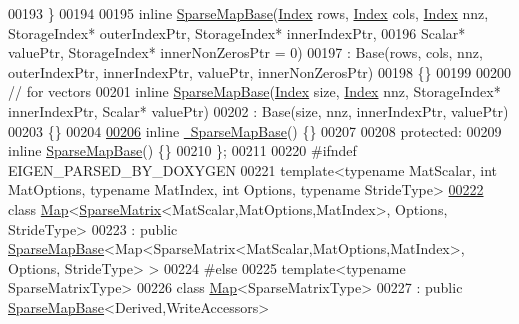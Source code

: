 \begin{DoxyCode}
00193     \}
00194     
00195     \textcolor{keyword}{inline} \hyperlink{class_eigen_1_1_sparse_map_base}{SparseMapBase}(\hyperlink{group___core___module_a554f30542cc2316add4b1ea0a492ff02}{Index} rows, \hyperlink{group___core___module_a554f30542cc2316add4b1ea0a492ff02}{Index} cols, \hyperlink{group___core___module_a554f30542cc2316add4b1ea0a492ff02}{Index} nnz, StorageIndex* 
      outerIndexPtr, StorageIndex* innerIndexPtr,
00196                          Scalar* valuePtr, StorageIndex* innerNonZerosPtr = 0)
00197       : Base(rows, cols, nnz, outerIndexPtr, innerIndexPtr, valuePtr, innerNonZerosPtr)
00198     \{\}
00199 
00200     \textcolor{comment}{// for vectors}
00201     \textcolor{keyword}{inline} \hyperlink{class_eigen_1_1_sparse_map_base}{SparseMapBase}(\hyperlink{group___core___module_a554f30542cc2316add4b1ea0a492ff02}{Index} size, \hyperlink{group___core___module_a554f30542cc2316add4b1ea0a492ff02}{Index} nnz, StorageIndex* innerIndexPtr, Scalar*
       valuePtr)
00202       : Base(size, nnz, innerIndexPtr, valuePtr)
00203     \{\}
00204 
\hyperlink{group___sparse_core___module_a4dfbcf3ac411885b1710ad04892c984d}{00206}     \textcolor{keyword}{inline} \hyperlink{group___sparse_core___module_a4dfbcf3ac411885b1710ad04892c984d}{~SparseMapBase}() \{\}
00207 
00208   \textcolor{keyword}{protected}:
00209     \textcolor{keyword}{inline} \hyperlink{class_eigen_1_1_sparse_map_base}{SparseMapBase}() \{\}
00210 \};
00211 
00220 \textcolor{preprocessor}{#ifndef EIGEN\_PARSED\_BY\_DOXYGEN}
00221 \textcolor{keyword}{template}<\textcolor{keyword}{typename} MatScalar, \textcolor{keywordtype}{int} MatOptions, \textcolor{keyword}{typename} MatIndex, \textcolor{keywordtype}{int} Options, \textcolor{keyword}{typename} Str\textcolor{keywordtype}{id}eType>
\hyperlink{group___sparse_core___module}{00222} \textcolor{keyword}{class }\hyperlink{group___core___module_class_eigen_1_1_map}{Map}<\hyperlink{group___sparse_core___module_class_eigen_1_1_sparse_matrix}{SparseMatrix}<MatScalar,MatOptions,MatIndex>, Options, StrideType>
00223   : \textcolor{keyword}{public} \hyperlink{class_eigen_1_1_sparse_map_base}{SparseMapBase}<Map<SparseMatrix<MatScalar,MatOptions,MatIndex>, Options, StrideType>
       >
00224 \textcolor{preprocessor}{#else}
00225 template<typename SparseMatrixType>
00226 class \hyperlink{group___core___module_class_eigen_1_1_map}{Map}<SparseMatrixType>
00227   : \textcolor{keyword}{public} \hyperlink{class_eigen_1_1_sparse_map_base}{SparseMapBase}<Derived,WriteAccessors>

\end{DoxyCode}
